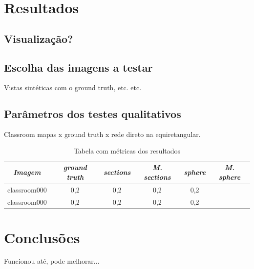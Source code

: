 \documentclass[cic,tc]{iiufrgs}
\begin{document}
\chapter{Resultados}
\section{Visualização?}


\section{Escolha das imagens a testar}
Vistas sintéticas com o ground truth, etc. etc.

\section{Parâmetros dos testes qualitativos}
Classroom mapas x ground truth x rede direto na equiretangular.

\begin{table}[h]
    \caption{Tabela com métricas dos resultados}
    \centering
        \begin{tabular}{c|c|c|c|c|c}
          \hline
          \textit{Imagem} & \textit{ground truth} & \textit{sections} & \textit{M. sections} &  \textit{sphere}  &   \textit{M. sphere} \\
          \hline
          \hline
          classroom000  &  0,2  &  0,2  &  0,2  &  0,2  \\
          classroom000  &  0,2  &  0,2  &  0,2  &  0,2  \\
          \hline
        \end{tabular}
    \label{tbl:results1}
\end{table}


\chapter{Conclusões}
Funcionou até, pode melhorar...



\end{document}
